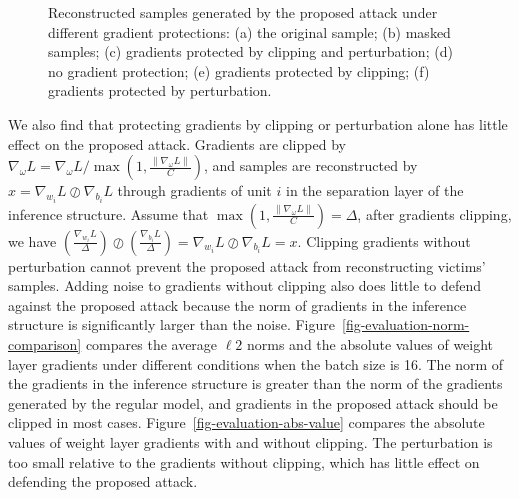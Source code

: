 \documentclass[lettersize,journal]{IEEEtran}
\begin{document}
\begin{figure}
\centering
{}\hspace{-0.1in}
\hspace{-0.1in}
    \hspace{-0.1in}
\hspace{-0.1in}
\hspace{-0.1in}
\caption{Reconstructed samples generated by the proposed attack under different gradient protections: (a) the original sample; (b) masked samples; (c) gradients protected by clipping and perturbation; (d) no gradient protection; (e) gradients protected by clipping; (f) gradients protected by perturbation.}
\label{fig-evaluation-one-different-protection}
\end{figure}

We also find that protecting gradients by clipping or perturbation alone has little effect on the proposed attack. Gradients are clipped by $\nabla_{\omega} L = \nabla_\omega L / \max \left(1 , \frac{\| \nabla_\omega L \|}{C} \right)$, and samples are reconstructed by $x= \nabla_{w_i} L \oslash \nabla_{b_i} L$ through gradients of unit $i$ in the separation layer of the inference structure. Assume that $\max \left(1 , \frac{\| \nabla_\omega L \|}{C} \right) = \Delta$, after gradients clipping, we have $\left(\frac{\nabla_{w_i} L}{\Delta}\right) \oslash \left(\frac{\nabla_{b_i} L}{\Delta}\right) = \nabla_{w_i} L \oslash \nabla_{b_i} L = x.$ Clipping gradients without perturbation cannot prevent the proposed attack from reconstructing victims' samples. Adding noise to gradients without clipping also does little to defend against the proposed attack because the norm of gradients in the inference structure is significantly larger than the noise. Figure~\ref{fig-evaluation-norm-comparison} compares the average $\ell2$ norms and the absolute values of weight layer gradients under different conditions when the batch size is 16. The norm of the gradients in the inference structure is greater than the norm of the gradients generated by the regular model, and gradients in the proposed attack should be clipped in most cases. Figure~\ref{fig-evaluation-abs-value} compares the absolute values of weight layer gradients with and without clipping. The perturbation is too small relative to the gradients without clipping, which has little effect on defending the proposed attack.
\end{document}
